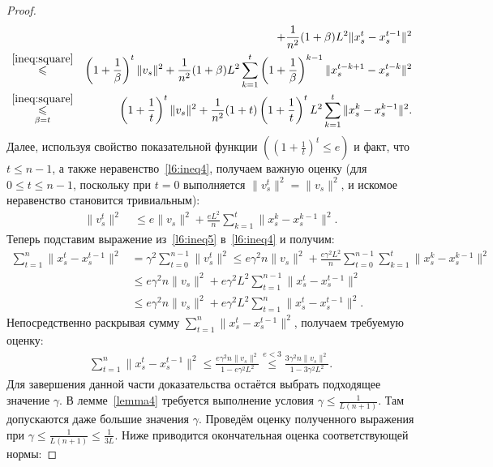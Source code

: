 \begin{lemma}
\begin{proof}
\begin{eqnarray*}
    & & + \frac{1}{n^2}(1 + \beta)L^2\|x_{s}^t - x_{s}^{t-1}\|^2 \\
    &\overset{\eqref{ineq:square}}{\leqslant}& \left(1 + \frac{1}{\beta}\right)^t\|v_{s}\|^2 + \frac{1}{n^2}(1 + \beta)L^2 \sum\limits_{k = 1}^t \left(1 + \frac{1}{\beta}\right)^{k-1}\|x_{s}^{t-k+1} - x_{s}^{t-k}\|^2 \\
    &\underset{\beta = t}{\overset{\eqref{ineq:square}}{\leqslant}}& \left(1 + \frac{1}{t}\right)^t \|v_{s}\|^2 +\frac{1}{n^2} (1+t)\left(1 + \frac{1}{t}\right)^t L^2\sum\limits_{k = 1}^t\|x_{s}^k - x_{s}^{k-1}\|^2.
\end{eqnarray*}
Далее, используя свойство показательной функции \(\left(\left(1 + \frac{1}{t}\right)^t \leqslant e\right)\) и факт, что \(t \leqslant n-1\), а также неравенство~\eqref{l6:ineq4}, получаем важную оценку (для \(0 \leqslant t \leqslant n-1\), поскольку при \(t = 0\) выполняется \(\|v_s^t\|^2 = \|v_s\|^2\), и искомое неравенство становится тривиальным):
\begin{align}
\label{l6:ineq5}
    \|v_{s}^t\|^2 & ~\leqslant e \|v_{s}\|^2 + \frac{e L^2}{n}\sum\limits_{k = 1}^t\|x_{s}^k - x_{s}^{k-1}\|^2.
\end{align}
Теперь подставим выражение из~\eqref{l6:ineq5} в~\eqref{l6:ineq4} и получим:
\begin{align*}
    \sum\limits_{t=1}^n\|x_s^t - x_s^{t-1}\|^2 & = \gamma^2\sum\limits_{t=0}^{n-1}\|v_s^{t}\|^2 \leqslant e\gamma^2 n \|v_s\|^2 + \frac{e\gamma^2 L^2}{n}\sum\limits_{t=0}^{n-1}\sum\limits_{k=1}^{t} \|x_{s}^k - x_{s}^{k-1}\|^2\\
    & \leqslant e\gamma^2 n \|v_s\|^2 + e\gamma^2 L^2\sum\limits_{t=1}^{n-1}\|x_{s}^t - x_{s}^{t-1}\|^2\\
    & \leqslant e\gamma^2 n \|v_s\|^2 + e\gamma^2 L^2\sum\limits_{t=1}^{n}\|x_{s}^t - x_{s}^{t-1}\|^2.
\end{align*}
Непосредственно раскрывая сумму \(\sum\limits_{t=1}^n\|x_s^t - x_s^{t-1}\|^2\), получаем требуемую оценку:
\begin{align*}
    \sum\limits_{t=1}^n\|x_s^t - x_s^{t-1}\|^2 \leqslant \frac{e\gamma^2 n \|v_s\|^2}{1 - e\gamma^2 L^2} \overset{e<3}{\leqslant}\frac{3\gamma^2 n \|v_s\|^2}{1 - 3\gamma^2L^2}.
\end{align*}
Для завершения данной части доказательства остаётся выбрать подходящее значение \(\gamma\). В лемме~\ref{lemma4} требуется выполнение условия \(\gamma \leqslant \frac{1}{L(n+1)}\). Там допускаются даже большие значения \(\gamma\). Проведём оценку полученного выражения при \(\gamma \leqslant \frac{1}{L(n+1)} \leqslant \frac{1}{3L}\). Ниже приводится окончательная оценка соответствующей нормы:

\end{proof}
\end{lemma}
